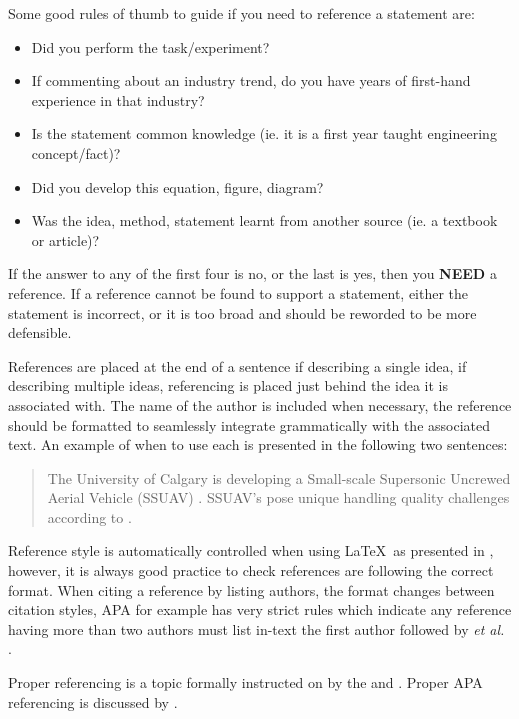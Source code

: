 \noindent
Some good rules of thumb to guide if you need to reference a statement are: 
\begin{itemize}
	\item Did you perform the task/experiment?
	\item If commenting about an industry trend, do you have years of first-hand experience in that industry?
	\item Is the statement common knowledge (ie. it is a first year taught engineering concept/fact)?
	\item Did you develop this equation, figure, diagram? 
	\item Was the idea, method, statement learnt from another source (ie. a textbook or article)?
\end{itemize}
\noindent
If the answer to any of the first four is no, or the last is yes, then you \textbf{NEED} a reference. 
If a reference cannot be found to support a statement, either the statement is incorrect, or it is too broad and should be reworded to be more defensible. 

References are placed at the end of a sentence if describing a single idea, if describing multiple ideas, referencing is placed just behind the idea it is associated with. The name of the author is included when necessary, the reference should be formatted to seamlessly integrate grammatically with the associated text. 
An example of when to use each is presented in the following two sentences:

\begin{quotation}
	\noindent 
	The University of Calgary is developing a Small-scale Supersonic Uncrewed Aerial Vehicle (SSUAV) \cite{BenConference}. SSUAV's pose unique handling quality challenges according to \citeauthor{BenConference} \cite{BenConference}.
\end{quotation}


\noindent 
Reference style is automatically controlled when using \LaTeX\ as presented in , however, it is always good practice to check references are following the correct format. When citing a reference by listing authors, the format changes between citation styles, APA for example has very strict rules which indicate any reference having more than two authors must list in-text the first author followed by \textit{et al.} \cite{apa}.

Proper referencing is a topic formally instructed on by the \citeauthor{writingUofC} \cite{writingUofC} and \citeauthor{writingCoursesUofC} \cite{writingCoursesUofC}. 
Proper APA referencing is discussed by \citeauthor{apa} \cite{apa}. 